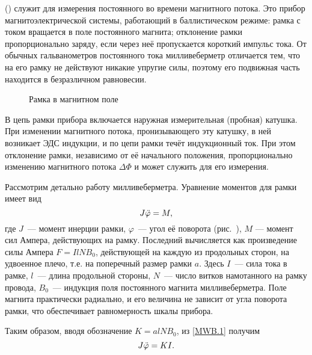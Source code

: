 
\begin{labsupplement}
\label{MWB}

 () служит для измерения постоянного во времени
магнитного потока. Это прибор магнитоэлектрической системы, 
работающий в баллистическом режиме: рамка с током вращается в поле 
постоянного магнита; отклонение рамки пропорционально заряду,
если через неё пропускается короткий импульс тока. 
От обычных гальванометров постоянного тока милливеберметр 
отличается тем, что на его рамку не действуют никакие упругие силы, 
поэтому его подвижная часть находится в безразличном равновесии.

\begin{wrapfigure}{o}{2.5cm}
    \centering
    \caption{Рамка в магнитном поле}
\end{wrapfigure}

В цепь рамки прибора включается наружная измерительная (пробная) катушка. 
При изменении магнитного потока, пронизывающего эту катушку, 
в ней возникает ЭДС индукции, и по цепи рамки течёт индукционный ток. 
При этом отклонение рамки, независимо от её начального
положения, пропорционально изменению магнитного потока $\Delta\Phi$ 
и может служить для его измерения.

Рассмотрим детально работу милливеберметра. 
Уравнение моментов для рамки имеет вид
\begin{equation}
    J\ddot{\varphi}=M,
    \eqmark{MWB.1}
\end{equation}
где $J$~--- момент инерции рамки, 
$\varphi$~--- угол её поворота (рис.~),
$M$ --- момент сил Ампера, действующих на рамку.
Последний вычисляется как произведение силы Ампера $F=IlNB_0$, 
действующей на каждую из продольных сторон,
на удвоенное плечо, т.е. на поперечный размер
рамки $a$. Здесь $I$~--- сила тока в рамке, $l$~--- длина продольной
стороны, $N$~--- число витков намотанного на рамку провода, 
$B_0$~--- индукция поля постоянного магнита милливеберметра. 
Поле магнита практически радиально, и его величина не зависит от угла поворота
рамки, что обеспечивает равномерность шкалы прибора. 

Таким образом, вводя обозначение $K=alNB_0$, из \eqref{MWB.1} 
получим
\begin{equation}
    J\ddot{\varphi}=KI.
    \eqmark{MWB.2}
\end{equation}


\end{labsupplement}
